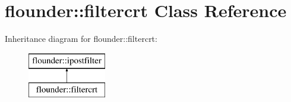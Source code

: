 \hypertarget{classflounder_1_1filtercrt}{}\section{flounder\+:\+:filtercrt Class Reference}
\label{classflounder_1_1filtercrt}
Inheritance diagram for flounder\+:\+:filtercrt\+:\begin{figure}[H]
\begin{center}
\leavevmode
\includegraphics[height=2.000000cm]{classflounder_1_1filtercrt}
\end{center}
\end{figure}
